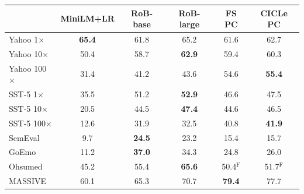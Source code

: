 \begin{tabular}{lccccc}
\toprule
 & MiniLM+LR & RoB-base & RoB-large & FS PC & CICLe PC \\
\midrule
Yahoo 1$\times$ & \textbf{65.4} & 61.8 & 65.2 & 61.6 & 62.7 \\
Yahoo 10$\times$ & 50.4 & 58.7 & \textbf{62.9} & 59.4 & 60.3 \\
Yahoo 100$\times$ & 31.4 & 41.2 & 43.6 & 54.6 & \textbf{55.4} \\
\midrule
SST-5 1$\times$ & 35.5 & 51.2 & \textbf{52.9} & 46.6 & 47.5 \\
SST-5 10$\times$ & 20.5 & 44.5 & \textbf{47.4} & 44.6 & 46.5 \\
SST-5 100$\times$ & 12.6 & 31.9 & 32.5 & 40.8 & \textbf{41.9} \\
\midrule
SemEval & 9.7 & \textbf{24.5} & 23.2 & 15.4 & 15.7 \\
GoEmo & 11.2 & \textbf{37.0} & 34.3 & 24.8 & 26.0 \\
Ohsumed & 45.2 & 55.4 & \textbf{65.6} & 50.4$^{\mathrm{F}}$ & 51.7$^{\mathrm{F}}$ \\
MASSIVE & 60.1 & 65.3 & 70.7 & \textbf{79.4} & 77.7 \\
\bottomrule
\end{tabular}
